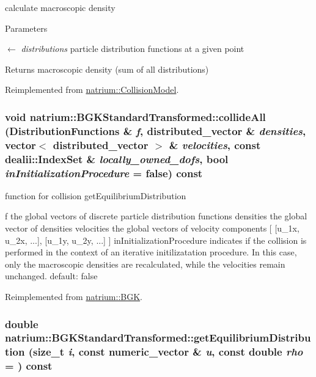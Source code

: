 calculate macroscopic density 
\begin{DoxyParams}{Parameters}
\item[\mbox{$\leftarrow$} {\em distributions}]particle distribution functions at a given point \end{DoxyParams}
\begin{DoxyReturn}{Returns}
macroscopic density (sum of all distributions) 
\end{DoxyReturn}


Reimplemented from \hyperlink{classnatrium_1_1CollisionModel_ae1c879c87ac210a227a8e3da2d0ac385}{natrium::CollisionModel}.\hypertarget{classnatrium_1_1BGKStandardTransformed_aaa2e752c6aa2294f1ebeb9d326ba9eb8}{
\subsubsection[{collideAll}]{\setlength{\rightskip}{0pt plus 5cm}void natrium::BGKStandardTransformed::collideAll ({\bf DistributionFunctions} \& {\em f}, \/  distributed\_\-vector \& {\em densities}, \/  vector$<$ distributed\_\-vector $>$ \& {\em velocities}, \/  const dealii::IndexSet \& {\em locally\_\-owned\_\-dofs}, \/  bool {\em inInitializationProcedure} = {\ttfamily false}) const}}
\label{classnatrium_1_1BGKStandardTransformed_aaa2e752c6aa2294f1ebeb9d326ba9eb8}


function for collision getEquilibriumDistribution

f the global vectors of discrete particle distribution functions densities the global vector of densities velocities the global vectors of velocity components \mbox{[} \mbox{[}u\_\-1x, u\_\-2x, ...\mbox{]}, \mbox{[}u\_\-1y, u\_\-2y, ...\mbox{]} \mbox{]} inInitializationProcedure indicates if the collision is performed in the context of an iterative initilizatation procedure. In this case, only the macroscopic densities are recalculated, while the velocities remain unchanged. default: false 

Reimplemented from \hyperlink{classnatrium_1_1BGK_a9fa1c980217a183fc4762954e86ba36d}{natrium::BGK}.\hypertarget{classnatrium_1_1BGKStandardTransformed_a870465cc026f92c8ffba899af6f95634}{
\subsubsection[{getEquilibriumDistribution}]{\setlength{\rightskip}{0pt plus 5cm}double natrium::BGKStandardTransformed::getEquilibriumDistribution (size\_\-t {\em i}, \/  const numeric\_\-vector \& {\em u}, \/  const double {\em rho} = {}) const}}
\label{classnatrium_1_1BGKStandardTransformed_a870465cc026f92c8ffba899af6f95634}


